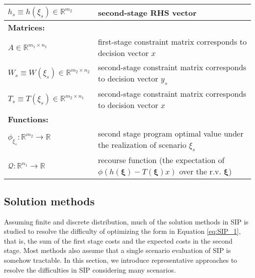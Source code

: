 \begin{table}[H]
{\begin{tabular}{ll}
			$h_s\equiv h(\xi_s)\in\mathbb{R}^{m_2}$	& second-stage RHS vector\\ \midrule
			\multicolumn{2}{l}{\textbf{Matrices:}} \\  
			$A\in\mathbb{R}^{m_1\times n_1}$	& first-stage constraint matrix corresponds to decision vector $x$\\
			$W_s\equiv W(\xi_s)\in\mathbb{R}^{m_2\times n_2}$	& second-stage constraint matrix corresponds to decision vector $y_s$\\
			$T_s\equiv T(\xi_s)\in\mathbb{R}^{m_2\times n_1}$	& second-stage constraint matrix corresponds to decision vector $x$\\ \midrule
			\multicolumn{2}{l}{\textbf{Functions:}} \\
			$\phi_{\xi_s}:\mathbb{R}^{m_2}\to\mathbb{R}$	& second stage program optimal value under the realization of scenario $\xi_s$	\\
			$\mathcal{Q}:\mathbb{R}^{n_1}\to\mathbb{R}$	& recourse function (the expectation of $\phi\left( h(\pmb{\xi})-T(\pmb{\xi})x \right)$ over the r.v. $\pmb{\xi}$) 	\\
			\bottomrule
		\end{tabular}
	}
\end{table} 

\subsection{Solution methods}
Assuming finite and discrete distribution, much of the solution methods in SIP is studied to resolve the difficulty of optimizing the form in Equation  \ref{eq:SIP_1}, that is, the sum of the first stage costs and the expected costs in the second stage. Most methods also assume that a single scenario evaluation of SIP is somehow tractable. In this section, we introduce representative approaches to resolve the difficulties in SIP considering many scenarios.


